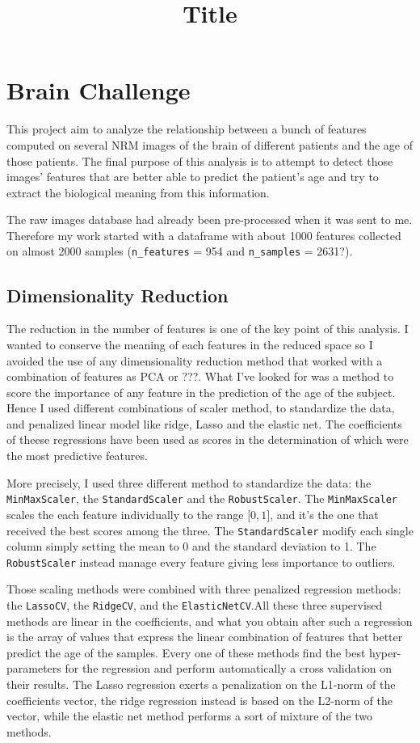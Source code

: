 \documentclass[12pt,a4paper]{report}
\begin{document}
\title{Title}

\section*{Brain Challenge}
This project aim to analyze the relationship between a bunch of features computed on several NRM images of the brain of different patients and the age of those patients. The final purpose of this analysis is to attempt to detect those images' features that are better able to predict the patient's age and try to extract the biological meaning from this information.

The raw images database had already been pre-processed when it was sent to me. Therefore my work started with a dataframe with about 1000 features collected on almost 2000 samples (\texttt{n\_features} = 954 and \texttt{n\_samples} = 2631?).


\subsection*{Dimensionality Reduction}
The reduction in the number of features is one of the key point of this analysis. I wanted to conserve the meaning of each features in the reduced space so I avoided the use of any dimensionality reduction method that worked with a combination of features as PCA or ???. What I've looked for was a method to score the importance of any feature in the prediction of the age of the subject. Hence I used different combinations of scaler method, to standardize the data, and penalized linear model like ridge, Lasso and the elastic net. The coefficients of theese regressions have been used as scores in the determination of which were the most predictive features.

More precisely, I used three different method to standardize the data: the \texttt{MinMaxScaler}, the \texttt{StandardScaler} and the \texttt{RobustScaler}. The \texttt{MinMaxScaler} scales the each feature individually to the range $\lbrack 0,1 \rbrack$, and it's the one that received the best scores among the three. The \texttt{StandardScaler} modify each single column simply setting the mean to 0 and the standard deviation to 1. The \texttt{RobustScaler} instead manage every feature giving less importance to outliers.

Those scaling methods were combined with three penalized regression methods: the \texttt{LassoCV}, the \texttt{RidgeCV}, and the \texttt{ElasticNetCV}.All these three supervised methods are linear in the coefficients, and what you obtain after such a regression is the array of values that express the linear combination of features that better predict the age of the samples. Every one of these methods find the best hyper-parameters for the regression and perform automatically a cross validation on their results.  The Lasso regression exerts a penalization on the L1-norm of the coefficients vector, the ridge regression instead is based on the L2-norm of the vector, while the elastic net method performs a sort of mixture of the two methods.
\end{document}

